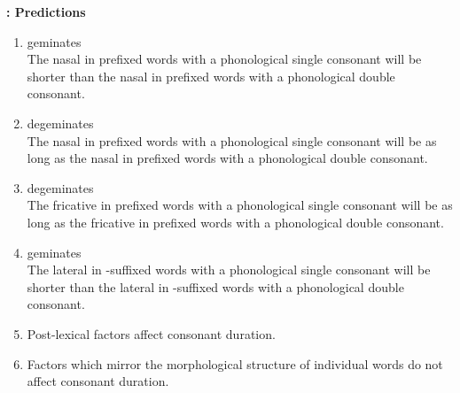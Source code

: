\newpage
\textbf{: Predictions}\textsl{}

\begin{enumerate}
	
	\item {} geminates \\
	The nasal in prefixed words with a phonological single consonant will be shorter than the nasal in prefixed words with a phonological double consonant. %
	
	\item {} degeminates \\
	The nasal in prefixed words with a phonological single consonant will be as long as the nasal in  prefixed words with a phonological double consonant.%
	
	
	
	\item {} degeminates \\
	The fricative in prefixed words with a phonological single consonant will be as long as the fricative in prefixed words with a phonological double consonant. %
	
	
	
	\item {} geminates \\
	The lateral in -suffixed words with a phonological single consonant will be shorter than the lateral in -suffixed words with a phonological double consonant.%
	
	\item Post-lexical factors affect consonant duration.
	
	\item Factors which mirror the morphological structure of individual words do not affect consonant duration.
	
\end{enumerate}






